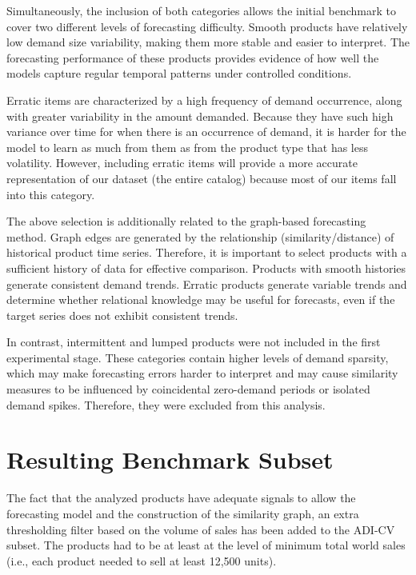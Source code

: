 Simultaneously, the inclusion of both categories allows the initial benchmark to cover two different levels of forecasting difficulty. Smooth products have relatively low demand size variability, making them more stable and easier to interpret. The forecasting performance of these products provides evidence of how well the models capture regular temporal patterns under controlled conditions.

Erratic items are characterized by a high frequency of demand occurrence, along with greater variability in the amount demanded. Because they have such high variance over time for when there is an occurrence of demand, it is harder for the model to learn as much from them as from the product type that has less volatility. However, including erratic items will provide a more accurate representation of our dataset (the entire catalog) because most of our items fall into this category.

The above selection is additionally related to the graph-based forecasting method. Graph edges are generated by the relationship (similarity/distance) of historical product time series. Therefore, it is important to select products with a sufficient history of data for effective comparison. Products with smooth histories generate consistent demand trends. Erratic products generate variable trends and determine whether relational knowledge may be useful for forecasts, even if the target series does not exhibit consistent trends.

In contrast, intermittent and lumped products were not included in the first experimental stage. These categories contain higher levels of demand sparsity, which may make forecasting errors harder to interpret and may cause similarity measures to be influenced by coincidental zero-demand periods or isolated demand spikes. Therefore, they were excluded from this analysis.



\section{Resulting Benchmark Subset}
\label{sec:resulting_benchmark_subset}
The fact that the analyzed products have adequate signals to allow the forecasting model and the construction of the similarity graph, an extra thresholding filter based on the volume of sales has been added to the ADI-CV subset. The products had to be at least at the level of minimum total world sales (i.e., each product needed to sell at least 12,500 units).

